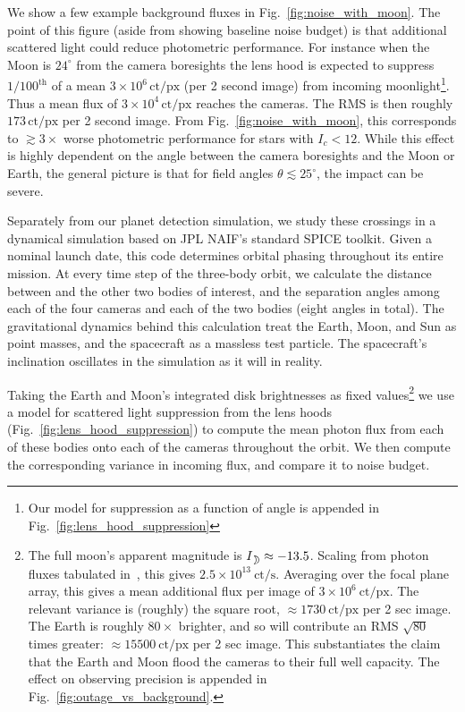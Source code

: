 We show a few
example background fluxes in Fig.~\ref{fig:noise_with_moon}.
The point of this figure (aside from showing \tesss baseline noise budget) is 
that additional scattered light could reduce \tesss photometric performance. 
For instance when the Moon is $24^\circ$ from the camera boresights the lens hood is expected to suppress $1/100^\mathrm{th}$ of a mean $3\times10^6\,\mathrm{ct/px}$ (per 2 second image) from incoming moonlight\footnote{Our model for suppression as a function of angle is appended in Fig.~\ref{fig:lens_hood_suppression}}.
Thus a mean flux of $3\times10^4\,\mathrm{ct/px}$ reaches the cameras. 
The RMS is then roughly $173\,\mathrm{ct/px}$ per 2 second image.
From Fig.~\ref{fig:noise_with_moon}, this corresponds to $\gtrsim\!3\times$ 
worse photometric performance for stars with $I_c < 12$.
While this effect is highly dependent on the angle between the camera boresights and the Moon or Earth, the general picture is that for field angles $\theta \lesssim25^{\circ}$, the impact can be severe.

Separately from our planet detection simulation, we study these 
crossings in a dynamical simulation based on JPL NAIF's standard SPICE toolkit.
Given a nominal launch date, this code determines \tesss orbital phasing 
throughout its entire mission. 
At every time step of the three-body orbit, we calculate the distance between 
\tess and the other two bodies of interest, and the separation angles among 
each of the four cameras and each of the two bodies (eight angles in total). 
The gravitational dynamics behind this calculation treat the Earth, Moon, and 
Sun as point masses, and the \tess spacecraft as a massless test particle.
The spacecraft's inclination oscillates in the simulation as it will in 
reality.

Taking the Earth and Moon's integrated disk brightnesses as fixed 
values\footnote{The full moon's apparent magnitude is $I_\moon \approx -13.5$. 
Scaling from photon fluxes tabulated in~\citet{winn_photonflux_2013}, this 
gives $2.5\times10^{13}\ \mathrm{ct/s}$. Averaging over the focal plane array, 
this gives a mean additional flux per image of $3\times10^6\ \mathrm{ct/px}$.
The relevant variance is (roughly) the square root, $\approx 1730\ \mathrm{ct/px}$ per 2 sec image.
The Earth is roughly $80\times$ brighter, and so will contribute an RMS 
$\sqrt{80}$ times greater: $\approx 15500\ \mathrm{ct/px}$ per 2 sec image.
This substantiates the claim that the Earth and Moon flood the cameras to their full well capacity. The effect on observing precision is appended in Fig.~\ref{fig:outage_vs_background}.} we use a model for scattered light suppression from 
the \tess lens hoods (Fig.~\ref{fig:lens_hood_suppression}) to compute the 
mean photon flux from each of these bodies onto each of the cameras throughout 
the orbit. We then compute the corresponding variance in incoming flux, and 
compare it to \tesss noise budget.

